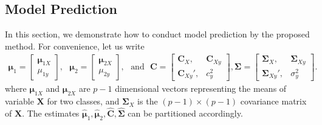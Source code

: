 \documentclass[12pt]{article}
\begin{document}
\subsection{Model Prediction}
In this section, we demonstrate how to conduct model prediction by the proposed method.
For convenience, let us write
\begin{align*}
\bm \mu_1 = \left[
\begin{array}{cc}
\bm \mu_{1X} \\
\mu_{1y}
\end{array}\right],~~~
\bm \mu_2 = \left[
\begin{array}{cc}
\bm \mu_{2X} \\
\mu_{2y}
\end{array}\right],~~~ \mbox{and} ~~~
\bm C = \left[
\begin{array}{cc}
\bm C_{X},      & \bm C_{Xy} \\
\bm C_{Xy}',   & c_{y}^2
\end{array}\right],
\bm \Sigma= \left[
\begin{array}{cc}
\bm \Sigma_{X},      & \bm \Sigma_{Xy} \\
\bm \Sigma_{Xy}',   & \sigma_{y}^2
\end{array}\right].
\end{align*}
where $\bm \mu_{1X}$ and $\bm \mu_{2X}$ are $p-1$ dimensional vectors representing the means of variable $\bm X$ for two classes, and $\bm \Sigma_{X}$ is the $(p-1) \times (p-1)$ covariance matrix of $\bm X$.
The estimates $\hat{\bm \mu}_1, \hat{\bm \mu}_2, \hat{\bm C}, \hat{\bm \Sigma}$ can be partitioned accordingly.
\end{document}
